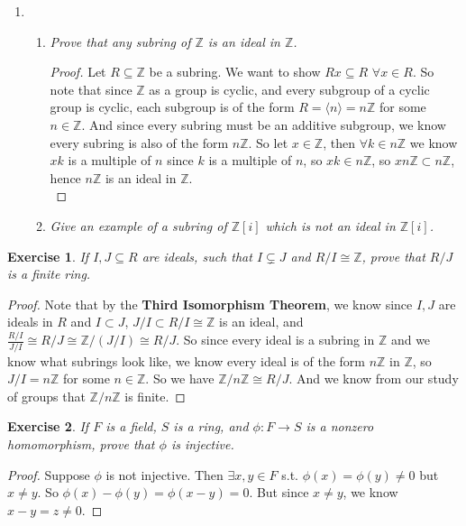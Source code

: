 \documentclass[10pt,oneside,reqno]{amsart}
\theoremstyle{plain}
\newtheorem{e}{Exercise}
\theoremstyle{definition}
\newcommand{\sub}{\subseteq}
\newcommand{\fa}{\forall}
\newcommand{\z}{\mathbb{Z}}
\begin{document}
\begin{enumerate}
\item 
\begin{enumerate}
\item \textit{Prove that any subring of $\mathbb{Z}$ is an ideal in $\mathbb{Z}$. }
\begin{proof}
Let $R\subseteq \mathbb{Z}$ be a subring. We want to show $Rx \sub R$ $\fa x \in R$. So note that since $\z$ as a group is cyclic, and every subgroup of a cyclic group is cyclic, each subgroup is of the form $R = \langle n \rangle = n\z$ for some $n \in \z$. And since every subring must be an additive subgroup, we know every subring is also of the form $n\z$. So let $x \in \z$, then $\fa k \in n\z$ we know $xk$ is a multiple of $n$ since $k$ is a multiple of $n$, so $xk \in n\z$, so $xn\z \subset n\z$, hence $n\z$ is an ideal in $\z$. \\
\end{proof}

\item \textit{Give an example of a subring of $\z[i]$ which is not an ideal in $\z[i]$. }
\end{enumerate}
\end{enumerate}

\begin{e}
If $I,J \sub R$ are ideals, such that $I \subsetneq J$ and $R/I \cong \z$, prove that $R/J$ is a finite ring. 
\end{e}
\begin{proof}
Note that by the \textbf{Third Isomorphism Theorem}, we know since $I,J$ are ideals in $R$ and $I \subset J$, $J/I \subset R/I \cong \z$ is an ideal, and $\frac{R/I}{J/I} \cong R/J \cong \z/(J/I) \cong R/J$. So since every ideal is a subring in $\z$ and we know what subrings look like, we know every ideal is of the form $n\z$ in $\z$, so $J/I = n\z$ for some $n \in \z$. So we have $\z/n\z \cong R/J$. And we know from our study of groups that $\z/n\z$ is finite. 
\end{proof}
\vspace{3mm}
\begin{e}
If $F$ is a field, $S$ is a ring, and $\phi:F \to S$ is a nonzero homomorphism, prove that $\phi$ is injective. 
\end{e}
\begin{proof}
Suppose $\phi$ is not injective. Then $\exists x,y \in F$ s.t. $\phi(x) = \phi(y) \neq 0$ but $x \neq y$. So $\phi(x) - \phi(y) = \phi(x - y) = 0$. But since $x \neq y$, we know $x - y  = z \neq 0$. 
\end{proof}
\end{document}
